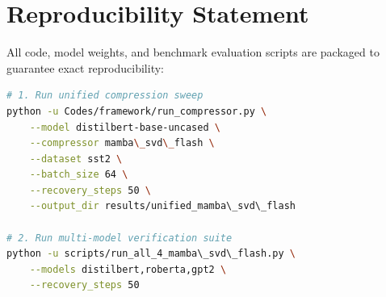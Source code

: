 \section{Reproducibility Statement}
All code, model weights, and benchmark evaluation scripts are packaged to guarantee exact reproducibility:
\begin{lstlisting}[language=bash]
# 1. Run unified compression sweep
python -u Codes/framework/run_compressor.py \
    --model distilbert-base-uncased \
    --compressor mamba\_svd\_flash \
    --dataset sst2 \
    --batch_size 64 \
    --recovery_steps 50 \
    --output_dir results/unified_mamba\_svd\_flash

# 2. Run multi-model verification suite
python -u scripts/run_all_4_mamba\_svd\_flash.py \
    --models distilbert,roberta,gpt2 \
    --recovery_steps 50
\end{lstlisting}
